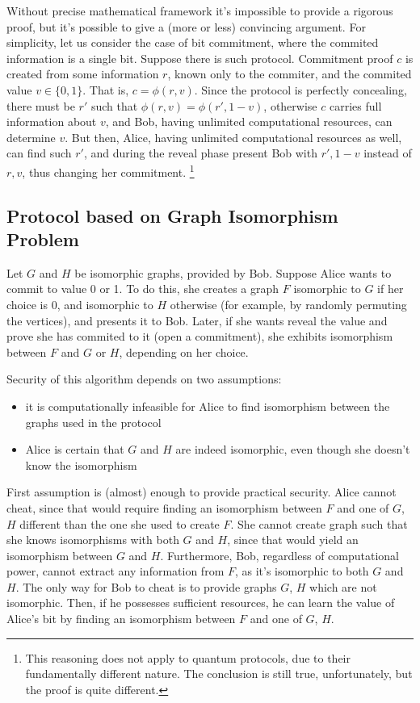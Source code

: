 \documentclass[10pt]{article}
\begin{document}
Without precise mathematical framework it's impossible to provide a rigorous proof, but it's possible 
to give a (more or less) convincing argument. For simplicity, let us consider the case of bit 
commitment, where the commited information is a single bit. Suppose there is such protocol. Commitment 
proof \(c\) is created from some information \(r\), known only to the commiter, and the commited value 
\(v\in\{0,1\}\). That is, \(c=\phi(r,v)\). Since the protocol is perfectly concealing, there must
be \(r'\) such that \(\phi(r,v)=\phi(r',1-v)\), otherwise \(c\) carries full information about \(v\),
and Bob, having unlimited computational resources, can determine \(v\). But then, Alice, having 
unlimited computational resources as well, can find such \(r'\), and during the reveal phase present 
Bob with \(r', 1-v\) instead of \(r, v\), thus changing her commitment.
\footnote{This reasoning does not apply to quantum protocols, due to their fundamentally different
nature. The conclusion is still true, unfortunately, but the proof is quite different.}

\subsection*{Protocol based on Graph Isomorphism Problem}

Let \(G\) and \(H\) be isomorphic graphs, provided by Bob. Suppose Alice wants to commit to value 0
or 1. To do this, she creates a graph \(F\) isomorphic to \(G\) if her choice is 0, and isomorphic 
to \(H\) otherwise (for example, by randomly permuting the vertices), and presents it to Bob. Later,
if she wants reveal the value and prove she has commited to it (open a commitment), she exhibits 
isomorphism between \(F\) and \(G\) or \(H\), depending on her choice.

Security of this algorithm depends on two assumptions:

\begin{itemize}
  \item it is computationally infeasible for Alice to find isomorphism between the graphs used in the
    protocol
  \item Alice is certain that \(G\) and \(H\) are indeed isomorphic, even though she doesn't know
    the isomorphism
\end{itemize}

First assumption is (almost) enough to provide practical security. Alice cannot cheat, since that would
require finding an isomorphism between \(F\) and one of \(G\), \(H\) different than the one she used to
create \(F\). She cannot create graph such that she knows isomorphisms with both \(G\) and \(H\), since
that would yield an isomorphism between \(G\) and \(H\). Furthermore, Bob, regardless of computational
power, cannot extract any information from \(F\), as it's isomorphic to both \(G\) and \(H\). The only 
way for Bob to cheat is to provide graphs \(G\), \(H\) which are not isomorphic. Then, if he possesses
sufficient resources, he can learn the value of Alice's bit by finding an isomorphism between \(F\) and
one of \(G\), \(H\).
\end{document}
